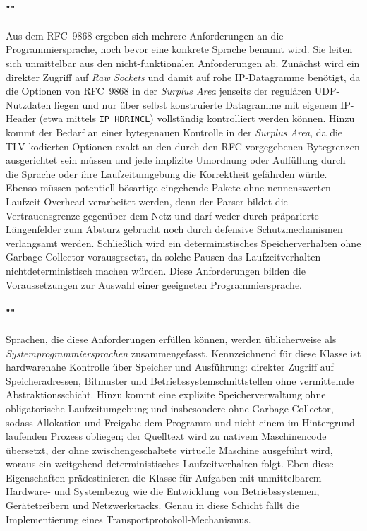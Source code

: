 \paragraph{""}
Aus dem RFC~9868 ergeben sich mehrere Anforderungen an die Programmiersprache, noch bevor eine konkrete Sprache
benannt wird. Sie leiten sich unmittelbar aus den nicht-funktionalen Anforderungen ab. Zunächst wird ein direkter
Zugriff auf \textit{Raw Sockets} und damit auf rohe IP-Datagramme benötigt, da die Optionen von RFC~9868 in der
\textit{Surplus Area} jenseits der regulären UDP-Nutzdaten liegen und nur über selbst konstruierte
Datagramme mit eigenem IP-Header (etwa mittels \texttt{IP\_HDRINCL}) vollständig kontrolliert werden können.
Hinzu kommt der Bedarf an einer bytegenauen Kontrolle in der \textit{Surplus Area}, da die TLV-kodierten Optionen
exakt an den durch den RFC vorgegebenen Bytegrenzen ausgerichtet sein müssen und jede implizite Umordnung oder
Auffüllung durch die Sprache oder ihre Laufzeitumgebung die Korrektheit gefährden würde. Ebenso müssen potentiell
bösartige eingehende Pakete ohne nennenswerten Laufzeit-Overhead verarbeitet werden, denn der Parser bildet die
Vertrauensgrenze gegenüber dem Netz und darf weder durch präparierte Längenfelder zum Absturz gebracht noch durch
defensive Schutzmechanismen verlangsamt werden. Schließlich wird ein deterministisches Speicherverhalten ohne
Garbage Collector vorausgesetzt, da solche Pausen das Laufzeitverhalten nichtdeterministisch machen würden. Diese
Anforderungen bilden die Voraussetzungen zur Auswahl einer geeigneten Programmiersprache.

\paragraph{""}
Sprachen, die diese Anforderungen erfüllen können, werden üblicherweise als \textit{Systemprogrammiersprachen}
zusammengefasst. Kennzeichnend für diese Klasse ist hardwarenahe Kontrolle über Speicher und Ausführung: direkter
Zugriff auf Speicheradressen, Bitmuster und Betriebssystemschnittstellen ohne vermittelnde Abstraktionsschicht. Hinzu
kommt eine explizite Speicherverwaltung ohne obligatorische Laufzeitumgebung und insbesondere ohne Garbage Collector,
sodass Allokation und Freigabe dem Programm und nicht einem im Hintergrund laufenden Prozess obliegen; der Quelltext
wird zu nativem Maschinencode übersetzt, der ohne zwischengeschaltete virtuelle Maschine ausgeführt wird, woraus ein
weitgehend deterministisches Laufzeitverhalten folgt. Eben diese Eigenschaften prädestinieren die Klasse für Aufgaben
mit unmittelbarem Hardware- und Systembezug wie die Entwicklung von Betriebssystemen, Gerätetreibern und
Netzwerkstacks. Genau in diese Schicht fällt die Implementierung eines Transportprotokoll-Mechanismus.

